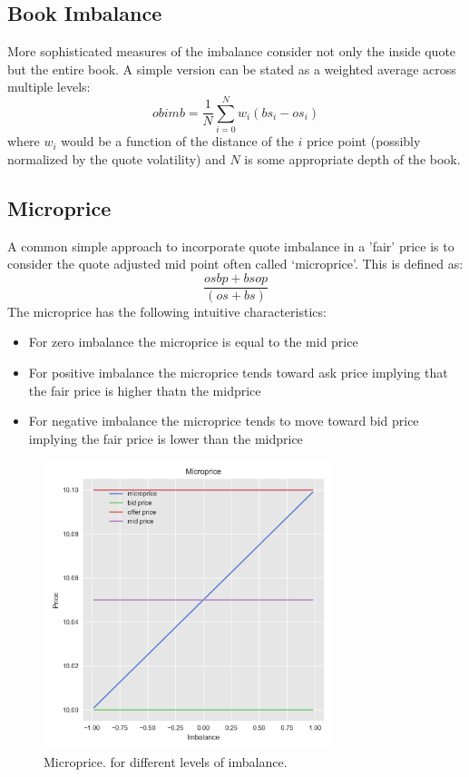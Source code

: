 \subsection{Book Imbalance}

More sophisticated measures of the imbalance consider not only the inside quote but the entire book. A simple version can be stated as a weighted average across multiple levels: 
	\begin{equation}\label{eq:microprc}
		obimb = \frac{1}{N}\sum_{i=0}^Nw_i (bs_i-os_i)
	\end{equation}
where $w_i$ would be a function of the distance of the $i$ price point (possibly normalized by the quote volatility) and $N$ is some appropriate depth of the book.


\subsection{Microprice}

A common simple approach to incorporate quote imbalance in a 'fair' price is to consider the quote adjusted mid point often called `microprice'. This is defined as:
	\begin{equation}\label{eqn:microprice}
		\frac{os bp + bs op}{(os+bs)}
	\end{equation}
The microprice has the following intuitive characteristics: 
	\begin{itemize}
	\item For zero imbalance the microprice is equal to the mid price
	\item For positive imbalance the microprice tends toward ask price implying that the fair price is higher thatn the midprice
	\item For negative imbalance the microprice tends to move toward bid price implying the fair price is lower than the midprice
\end{itemize}

	\begin{figure}[!ht]
		\centering
			\includegraphics[width=0.75\textwidth]{chapters/chapter_trade_data_models/figures/microprice.png} 
		\caption{Microprice. for different levels of imbalance. \label{fig:microprice}}
	\end{figure}

